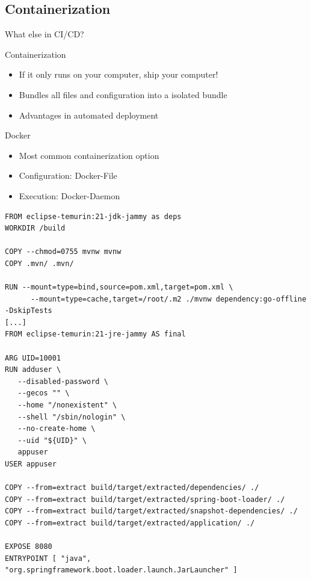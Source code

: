 \subsection{Containerization}
\begin{frame}[fragile]{What else in CI/CD? \insertsubsection{}}
	\begin{fancycolumns}[widths={30}]
		\begin{definition}{Containerization}
			\begin{itemize}
				\item If it only runs on your computer, ship your computer!
				\item Bundles all files and configuration into a isolated bundle
				\item Advantages in automated deployment
			\end{itemize}
		\end{definition}
		\begin{note}{Docker}
			\begin{itemize}
				\item Most common containerization option
				\item Configuration: Docker-File
				\item Execution: Docker-Daemon
			\end{itemize}
		\end{note}
		\nextcolumn
		\begin{lstlisting}[language={}, basicstyle=\tiny, breaklines=true, numbers=none]
FROM eclipse-temurin:21-jdk-jammy as deps
WORKDIR /build

COPY --chmod=0755 mvnw mvnw
COPY .mvn/ .mvn/

RUN --mount=type=bind,source=pom.xml,target=pom.xml \
      --mount=type=cache,target=/root/.m2 ./mvnw dependency:go-offline -DskipTests
[...]
FROM eclipse-temurin:21-jre-jammy AS final

ARG UID=10001
RUN adduser \
   --disabled-password \
   --gecos "" \
   --home "/nonexistent" \
   --shell "/sbin/nologin" \
   --no-create-home \
   --uid "${UID}" \
   appuser
USER appuser

COPY --from=extract build/target/extracted/dependencies/ ./
COPY --from=extract build/target/extracted/spring-boot-loader/ ./
COPY --from=extract build/target/extracted/snapshot-dependencies/ ./
COPY --from=extract build/target/extracted/application/ ./

EXPOSE 8080
ENTRYPOINT [ "java", "org.springframework.boot.loader.launch.JarLauncher" ]
		\end{lstlisting}
	\end{fancycolumns}
\end{frame}

